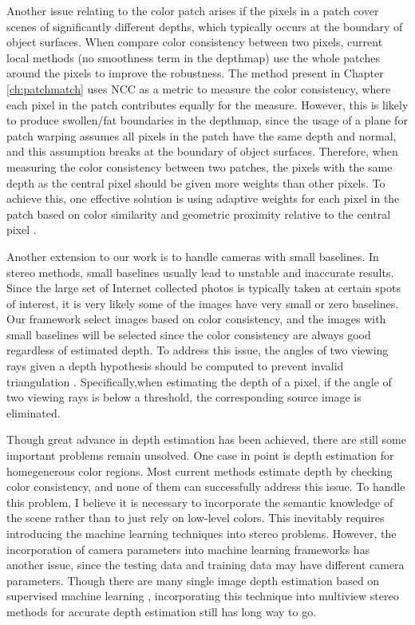 Another issue relating to the color patch arises if the pixels in a patch cover scenes of significantly different depths, which typically occurs at the boundary of object surfaces. 
When compare color consistency between two pixels, current local methods (\ie no smoothness term in the depthmap) use the whole patches around the pixels to improve the robustness.
The method present in Chapter \ref{ch:patchmatch} uses NCC as a metric to measure the color consistency, where each pixel in the patch contributes equally for the measure.
However, this is likely to produce swollen/fat boundaries in the depthmap, since the usage of a plane for patch warping assumes all pixels in the patch have the same depth and normal, and this assumption breaks at the boundary of object surfaces. Therefore, when measuring the color consistency between two patches, the pixels with the same depth as the central pixel should be given more weights than other pixels. To achieve this, one effective solution is using adaptive weights for each pixel in the patch based on color similarity and geometric proximity relative to the central pixel \cite{Yoon06adaptivesupport_weight}. 

Another extension to our work is to handle cameras with small baselines. In stereo methods, small baselines usually lead to unstable and inaccurate results. Since the large set of Internet collected photos is typically taken at certain spots of interest, it is very likely some of the images have very small or zero baselines. Our framework select images based on color consistency, and the images with small baselines will be selected since the color consistency are always good regardless of estimated depth. To address this issue, the angles of two viewing rays given a depth hypothesis should be computed to prevent invalid triangulation \cite{Gallup08}. Specifically,when estimating the depth of a pixel, if the angle of two viewing rays is below a threshold, the corresponding source image is eliminated.

Though great advance in depth estimation has been achieved, there are still some important problems remain unsolved. One case in point is depth estimation for homegenerous color regions. 
Most current methods estimate depth by checking color consistency, and none of them can successfully address this issue.  
To handle this problem, I believe it is necessary to incorporate the semantic knowledge of the scene rather than to just rely on low-level colors. This inevitably requires introducing the machine learning techniques into stereo problems. However, the incorporation of camera parameters into machine learning frameworks has another issue, since the testing data and training data may have different camera parameters. Though there are many single image depth estimation based on supervised machine learning \cite{Hoiem_CGRAPH2005,Saxena_IJCV2008,eigen2014depth,Liu2014,zhuo2015indoor}, incorporating this technique into multiview stereo methods for accurate depth estimation still has long way to go.

